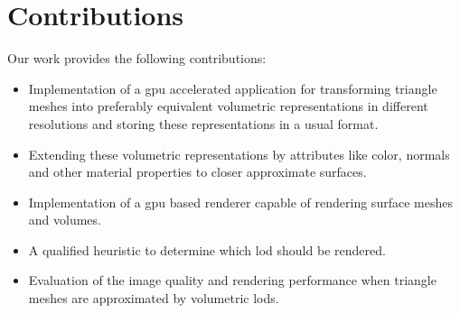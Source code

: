\section{Contributions}
Our work provides the following contributions:
\begin{itemize}
    \item Implementation of a \ac{gpu} accelerated application for transforming triangle meshes into preferably equivalent volumetric representations in different resolutions and storing these representations in a usual format.
    \item Extending these volumetric representations by attributes like color, normals and other material properties to closer approximate surfaces.
    \item Implementation of a \ac{gpu} based renderer capable of rendering surface meshes and volumes.
    \item A qualified heuristic to determine which \ac{lod} should be rendered.
    \item Evaluation of the image quality and rendering performance when triangle meshes are approximated by volumetric \acsp{lod}.
\end{itemize}
